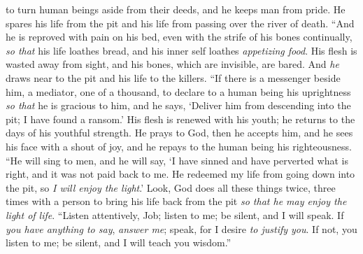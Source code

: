 \begin{biblechapter}
\verse to turn human beings aside from their deeds, 
and he keeps man from pride.
\verse He spares his life from the pit 
and his life from passing over the river of death.
\verse “And he is reproved with pain on his bed, 
even with the strife of his bones continually,
\verse \textit{so that} his life loathes bread, 
and his inner self loathes \textit{appetizing food}.
\verse His flesh is wasted away from sight, 
and his bones, which are invisible, are bared.
\verse And \textit{he} draws near to the pit 
and his life to the killers.
\verse “If there is a messenger beside him, a mediator, one of a thousand, 
to declare to a human being his uprightness
\verse \textit{so that} he is gracious to him, and he says, 
‘Deliver him from descending into the pit; 
I have found a ransom.’
\verse His flesh is renewed with his youth; 
he returns to the days of his youthful strength.
\verse He prays to God, then he accepts him, 
and he sees his face with a shout of joy, 
and he repays to the human being his righteousness.
\verse “He will sing to men, and he will say, 
‘I have sinned and have perverted what is right, 
and it was not paid back to me.
\verse He redeemed my life from going down into the pit, 
so \textit{I will enjoy the light}.’
\verse Look, God does all these things 
twice, three times with a person
\verse to bring his life back from the pit 
\textit{so that he may enjoy the light of life}.
\verse “Listen attentively, Job; listen to me; 
be silent, and I will speak.
\verse If \textit{you have anything to say}, \textit{answer me}; 
speak, for I desire \textit{to justify you}.
\verse If not, you listen to me; 
be silent, and I will teach you wisdom.”
\end{biblechapter}

